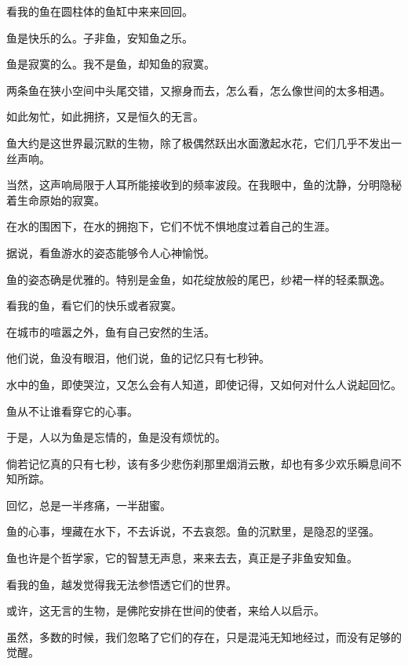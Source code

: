 		\vspace{1em}
		看我的鱼在圆柱体的鱼缸中来来回回。

		\vspace{1em}
		鱼是快乐的么。子非鱼，安知鱼之乐。\par
		鱼是寂寞的么。我不是鱼，却知鱼的寂寞。\par
		两条鱼在狭小空间中头尾交错，又擦身而去，怎么看，怎么像世间的太多相遇。\par
		如此匆忙，如此拥挤，又是恒久的无言。

		\vspace{1em}
		鱼大约是这世界最沉默的生物，除了极偶然跃出水面激起水花，它们几乎不发出一丝声响。\par
		当然，这声响局限于人耳所能接收到的频率波段。在我眼中，鱼的沈静，分明隐秘着生命原始的寂寞。\par
		在水的围困下，在水的拥抱下，它们不忧不惧地度过着自己的生涯。

		\vspace{1em}
		据说，看鱼游水的姿态能够令人心神愉悦。\par
		鱼的姿态确是优雅的。特别是金鱼，如花绽放般的尾巴，纱裙一样的轻柔飘逸。\par
		看我的鱼，看它们的快乐或者寂寞。\par
		在城市的喧嚣之外，鱼有自己安然的生活。

		\vspace{1em}
		他们说，鱼没有眼泪，他们说，鱼的记忆只有七秒钟。\par
		水中的鱼，即使哭泣，又怎么会有人知道，即使记得，又如何对什么人说起回忆。

		\vspace{1em}
		鱼从不让谁看穿它的心事。\par
		于是，人以为鱼是忘情的，鱼是没有烦忧的。\par
		倘若记忆真的只有七秒，该有多少悲伤刹那里烟消云散，却也有多少欢乐瞬息间不知所踪。

		\vspace{1em}
		回忆，总是一半疼痛，一半甜蜜。

		\vspace{1em}
		鱼的心事，埋藏在水下，不去诉说，不去哀怨。鱼的沉默里，是隐忍的坚强。\par
		鱼也许是个哲学家，它的智慧无声息，来来去去，真正是子非鱼安知鱼。\par
		看我的鱼，越发觉得我无法参悟透它们的世界。\par
		或许，这无言的生物，是佛陀安排在世间的使者，来给人以启示。\par
		虽然，多数的时候，我们忽略了它们的存在，只是混沌无知地经过，而没有足够的觉醒。

